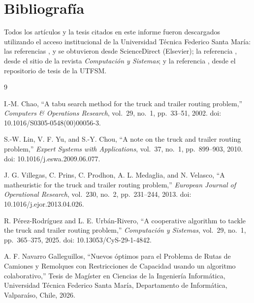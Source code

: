 \documentclass[letter, 10pt]{article}
\begin{document}
\section{Bibliograf\'ia}

Todos los art\'iculos y la tesis citados en este informe fueron descargados utilizando el acceso institucional de la Universidad T\'ecnica Federico Santa Mar\'ia: las referencias \cite{Chao2002}, \cite{LinYuChou2010} y \cite{Villegas2013} se obtuvieron desde ScienceDirect (Elsevier); la referencia \cite{PerezRodriguezUrban2025}, desde el sitio de la revista \emph{Computaci\'on y Sistemas}; y la referencia \cite{Navarro2026}, desde el repositorio de tesis de la UTFSM.

\begin{thebibliography}{9}

I.-M. Chao, ``A tabu search method for the truck and trailer routing problem,'' \emph{Computers \& Operations Research}, vol.~29, no.~1, pp.~33--51, 2002. doi: 10.1016/S0305-0548(00)00056-3.

S.-W. Lin, V. F. Yu, and S.-Y. Chou, ``A note on the truck and trailer routing problem,'' \emph{Expert Systems with Applications}, vol.~37, no.~1, pp.~899--903, 2010. doi: 10.1016/j.eswa.2009.06.077.

J. G. Villegas, C. Prins, C. Prodhon, A. L. Medaglia, and N. Velasco, ``A matheuristic for the truck and trailer routing problem,'' \emph{European Journal of Operational Research}, vol.~230, no.~2, pp.~231--244, 2013. doi: 10.1016/j.ejor.2013.04.026.

R. P\'erez-Rodr\'iguez and L. E. Urb\'an-Rivero, ``A cooperative algorithm to tackle the truck and trailer routing problem,'' \emph{Computaci\'on y Sistemas}, vol.~29, no.~1, pp.~365--375, 2025. doi: 10.13053/CyS-29-1-4842.

A. F. Navarro Galleguillos, ``Nuevos \'optimos para el Problema de Rutas de Camiones y Remolques con Restricciones de Capacidad usando un algoritmo colaborativo,'' Tesis de Mag\'ister en Ciencias de la Ingenier\'ia Inform\'atica, Universidad T\'ecnica Federico Santa Mar\'ia, Departamento de Inform\'atica, Valpara\'iso, Chile, 2026.

\end{thebibliography}
\end{document}
